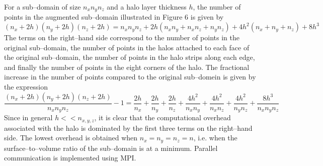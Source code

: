 \documentclass[dvips]{article}
\begin{document}
For a sub--domain of size $n_{x}n_{y}n_{z}$ and a halo layer thickness
$h$, the number of points in the augmented sub--domain illustrated in
Figure 6 is given by
\begin{equation}
(n_{x}+2h)(n_{y}+2h)(n_{z}+2h) = n_{x}n_{y}n_{z}
+ 2h\left(n_{x}n_{y} +n_{x}n_{z} + n_{y}n_{z}\right)
+ 4h^{2}\left(n_{x}+n_{y}+n_{z}\right) + 8h^{3}
\end{equation}
The terms on the right--hand side correspond to the number of points in
the original sub--domain, the number of points in the halos attached to
each face of the original sub--domain, the number of points in the halo
strips along each edge, and finally the number of points in the eight
corners of the halo.  The fractional increase in the number of points
compared to the original sub--domein is given by the expression
\begin{equation}
\frac{(n_{x}+2h)(n_{y}+2h)(n_{z}+2h)}{n_{x}n_{y}n_{z}} - 1 =
  \frac{2h}{n_{x}} + \frac{2h}{n_{y}} + \frac{2h}{n_{z}}
+ \frac{4h^{2}}{n_{x}n_{y}}
+ \frac{4h^{2}}{n_{x}n_{z}}
+ \frac{4h^{2}}{n_{y}n_{z}}
+ \frac{8h^{3}}{n_{x}n_{y}n_{z}}
\end{equation}
Since in general $h<<n_{x,y,z}$, it is clear that the computational
overhead associated with the halo is dominated by the first three terms
on the right--hand side.  The lowest overhead is obtained when $n_{x} =
n_{y} = n_{z} = n$, i.e. when the surface--to--volume ratio of the
sub--domain is at a minimum.  Parallel communication is implemented using
MPI.
\end{document}
